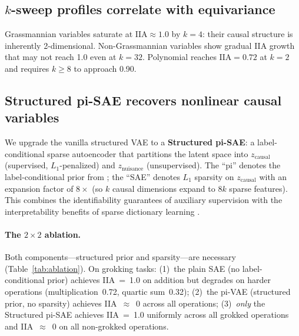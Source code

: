 \documentclass{article}
\newcommand{\IIA}{\mathrm{IIA}}
\begin{document}
\subsection{$k$-sweep profiles correlate with equivariance}

Grassmannian variables saturate at $\IIA \approx 1.0$ by $k = 4$: their causal
structure is inherently 2-dimensional. Non-Grassmannian variables show gradual IIA
growth that may not reach 1.0 even at $k = 32$. Polynomial reaches
$\IIA = 0.72$ at $k = 2$ and requires $k \geq 8$ to approach 0.90.

\subsection{Structured pi-SAE recovers nonlinear causal variables}
\label{sec:vae_results}

We upgrade the vanilla structured VAE to a \textbf{Structured pi-SAE}: a
label-conditional sparse autoencoder that partitions the latent space into
$z_\text{causal}$ (supervised, $L_1$-penalized) and $z_\text{nuisance}$
(unsupervised). The ``pi'' denotes the label-conditional prior from
\citet{narayanaswamy2017learning}; the ``SAE'' denotes $L_1$ sparsity on
$z_\text{causal}$ with an expansion factor of $8\times$ (so $k$ causal
dimensions expand to $8k$ sparse features). This combines the identifiability
guarantees of auxiliary supervision \citep{khemakhem2020variational} with the
interpretability benefits of sparse dictionary learning
\citep{bricken2023towards}.

\paragraph{The $2 \times 2$ ablation.}
Both components---structured prior and sparsity---are necessary
(Table~\ref{tab:ablation}). On grokking tasks: (1)~the plain SAE (no
label-conditional prior) achieves IIA~=~1.0 on addition but degrades on harder
operations (multiplication~0.72, quartic sum~0.32); (2)~the pi-VAE (structured
prior, no sparsity) achieves IIA~$\approx$~0 across all operations;
(3)~\emph{only} the Structured pi-SAE achieves IIA~=~1.0 uniformly across all
grokked operations and IIA~$\approx$~0 on all non-grokked operations.
\end{document}
